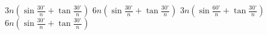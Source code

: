 \documentclass{ctexart}
\begin{document}
    \begin{xchoices}[label-hsep = 1em]
      \xitem
      $3 n(\sin \frac{30^{\circ}}{n}+\tan \frac{30^{\circ}}{n})$
      \xitem*
      $6 n(\sin \frac{30^{\circ}}{n}+\tan \frac{30^{\circ}}{n})$
      \xitem
      $3 n(\sin \frac{60^{\circ}}{n}+\tan \frac{30^{\circ}}{n})$
      \xitem
      $6 n(\sin \frac{30^{\circ}}{n}+\tan \frac{30^{\circ}}{n})$ 
    \end{xchoices}
\end{document}
